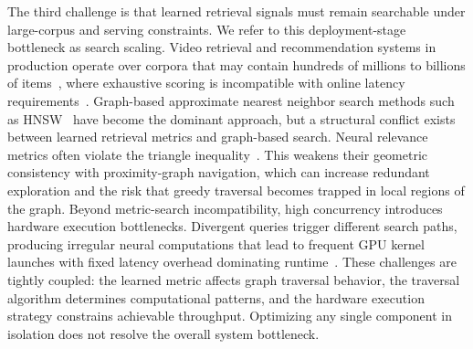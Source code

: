 The third challenge is that learned retrieval signals must remain searchable under large-corpus and serving constraints. We refer to this deployment-stage bottleneck as search scaling. Video retrieval and recommendation systems in production operate over corpora that may contain hundreds of millions to billions of items~\cite{wu2022survey,zhu2018learning}, where exhaustive scoring is incompatible with online latency requirements~\cite{liu2021jizhi}. Graph-based approximate nearest neighbor search methods such as HNSW~\cite{malkov2018efficient} have become the dominant approach, but a structural conflict exists between learned retrieval metrics and graph-based search. Neural relevance metrics often violate the triangle inequality~\cite{chen2022approximate}. This weakens their geometric consistency with proximity-graph navigation, which can increase redundant exploration and the risk that greedy traversal becomes trapped in local regions of the graph. Beyond metric-search incompatibility, high concurrency introduces hardware execution bottlenecks. Divergent queries trigger different search paths, producing irregular neural computations that lead to frequent GPU kernel launches with fixed latency overhead dominating runtime~\cite{el2016klap,liu2022lion}. These challenges are tightly coupled: the learned metric affects graph traversal behavior, the traversal algorithm determines computational patterns, and the hardware execution strategy constrains achievable throughput. Optimizing any single component in isolation does not resolve the overall system bottleneck.

